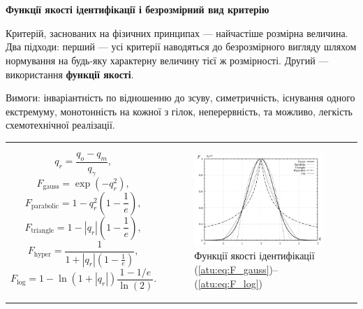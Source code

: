 \documentclass[14pt,handout,utf8]{beamer}
\newlength\TW
\newcommand{\Xhead}[1]{
 \begin{center}%
      \textbf{#1}%
 \end{center}%
}
\begin{document}
\begin{frame}
  \frametitle{~}

  \Xhead{Функції якості ідентифікації і безрозмірний вид критерію}

  Критерій, заснованих на фізичних принципах --- найчастіше розмірна величина.
  Два підходи: перший --- усі критерії наводяться до безрозмірного
  вигляду шляхом нормування на будь-яку характерну величину тієї ж
  розмірності.
  Другий --- використання
  \textbf{функції якості}.

  Вимоги:
  інваріантність по відношенню до зсуву, симетричність,
  існування одного екстремуму, монотонність на кожної з гілок,
  неперервність, та можливо, легкість схемотехнічної реалізації.


  \begin{tabular}{p{45\TW}|p{52\TW}}
  \[
      q_r = \frac{q_o - q_m}{q_\gamma},
  \]
  \begin{equation}
    F_{\mathrm{gauss}} = \exp( - q_r^2 ),
  \label{atu:eq:F_gauss}
  \end{equation}
  \begin{equation}
    F_{\mathrm{parabolic}} = 1 - q_r^2 \left( 1 - \frac{1}{e} \right),
  \label{atu:eq:F_parabolic}
  \end{equation}
  \begin{equation}
    F_{\mathrm{triangle}} = 1 - |q_r| \left( 1 - \frac{1}{e} \right),
  \label{atu:eq:F_triangle}
  \end{equation}
  \begin{equation}
    F_{\mathrm{hyper}} = \frac{1}{ 1 + |q_r| \left( 1 - \frac{1}{e} \right)},
  \label{atu:eq:F_hyper}
  \end{equation}
  \begin{equation}
    F_{\mathrm{log}} = 1 - \ln \left( 1 + |q_r| \right) \frac{1-1/e}{\ln(2)}.
  \label{atu:eq:F_log}
  \end{equation}
 &
  \begin{figure}[htb!]
    \includegraphics[width=55\TW]{../p3/p/F_types.png}
    \caption{Функції якості ідентифікації (\ref{atu:eq:F_gauss})--(\ref{atu:eq:F_log})}
    \label{atu:f:F_types}
  \end{figure}
  \end{tabular}


\end{frame}
\end{document}
